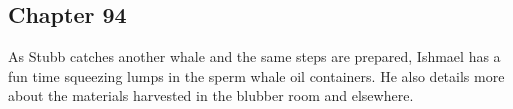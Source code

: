 \subsection{Chapter 94}

As Stubb catches another whale and the same steps are prepared, Ishmael has a
fun time squeezing lumps in the sperm whale oil containers. He also details
more about the materials harvested in the blubber room and elsewhere.
